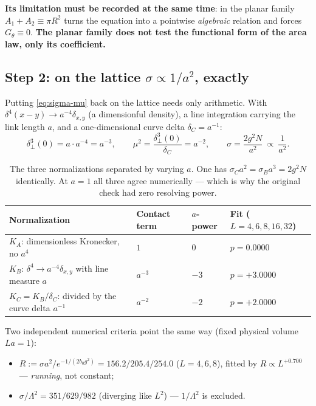 \noindent
\textbf{Its limitation must be recorded at the same time}: in the planar family $A_1+A_2\equiv\pi R^{2}$
turns the equation into a pointwise \emph{algebraic} relation and forces $G_\theta\equiv0$.
\textbf{The planar family does not test the functional form of the area law, only its coefficient.} \LT
{}

\subsection{Step 2: on the lattice $\sigma\propto1/a^{2}$, exactly}

Putting \eqref{eq:sigma-mu} back on the lattice needs only arithmetic. With
$\delta^{4}(x-y)\to a^{-4}\delta_{x,y}$ (a dimensionful density), a line integration carrying the link
length $a$, and a one-dimensional curve delta $\delta_C=a^{-1}$: \LT
\begin{equation}
  \delta^{3}_{\perp}(0)=a\cdot a^{-4}=a^{-3},
  \qquad
  \mu^{2}=\frac{\delta^{3}_{\perp}(0)}{\delta_C}=a^{-2},
  \qquad
  \sigma=\frac{2g^{2}N}{a^{2}}\ \propto\ \frac{1}{a^{2}} .
\end{equation}

\begin{table}[h]
\centering\footnotesize
\setlength{\tabcolsep}{7pt}
\renewcommand{\arraystretch}{1.1}
\begin{tabular}{@{}l l l l@{}}
\toprule
\textbf{Normalization} & \textbf{Contact term} & \textbf{$a$-power} & \textbf{Fit ($L=4,6,8,16,32$)}\\
\midrule
$K_A$: dimensionless Kronecker, no $a^{4}$ & $1$ & $0$ & $p=0.0000$\\
$K_B$: $\delta^{4}\to a^{-4}\delta_{x,y}$ with line measure $a$ & $a^{-3}$ & $-3$ & $p=+3.0000$\\
$K_C=K_B/\delta_C$: divided by the curve delta $a^{-1}$ & $a^{-2}$ & $-2$ & $p=+2.0000$\\
\bottomrule
\end{tabular}
\caption{The three normalizations separated by varying $a$. One has
$\sigma_C a^{2}=\sigma_B a^{3}=2g^{2}N$ identically. At $a=1$ all three agree numerically --- which is
why the original check had zero resolving power.}
\label{tab:apower}
\end{table}

\noindent
Two independent numerical criteria point the same way (fixed physical volume $La=1$): \LE
\begin{itemize}
\item $R:=\sigma a^{2}/e^{-1/(2b_0g^{2})}=156.2/205.4/254.0$ ($L=4,6,8$), fitted by
      $R\propto L^{+0.700}$ --- \emph{running}, not constant;
\item $\sigma/\Lambda^{2}=351/629/982$ (diverging like $L^{2}$) --- $1/\Lambda^{2}$ is excluded.
\end{itemize}

